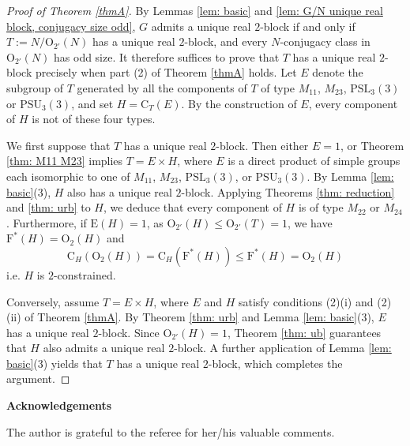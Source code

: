 \documentclass[10pt]{article}
\makeatletter
\newcommand{\ackname}{Acknowledgements}
\newenvironment{acknowledgement}{%
    \titlepage
    \null\vfil
    \@beginparpenalty\@lowpenalty
    \begin{center}%
      \bfseries \ackname
      \@endparpenalty\@M
    \end{center}}%
  {\par\vfil\null\endtitlepage}
\newenvironment{acknowledgement}{%
    \if@twocolumn
      \section*{\ackname}%
    \else
      \small
      \begin{center}%
        {\bfseries \ackname\vspace{-0.5em}\vspace{\z@}}%
      \end{center}%
      \quotation
    \fi}
    {\if@twocolumn\else\endquotation\fi}
\makeatother
\begin{document}
\begin{proof}[Proof of Theorem \ref{thmA}]
  By Lemmas \ref{lem: basic} and \ref{lem: G/N unique real block, conjugacy size odd}, $G$ admits a unique real $2$-block if and only if $T:=N/\mathrm{O}_{2'}(N)$ has a unique real $2$-block,
  and every $N$-conjugacy class in $\mathrm{O}_{2'}(N)$ has odd size.
  It therefore suffices to prove that $T$ has a unique real $2$-block 
  precisely when part (2) of Theorem \ref{thmA} holds.
  Let $E$ denote the subgroup of $T$ generated by all the components of $T$ of type $M_{11}$, $M_{23}$, $\mathrm{PSL}_{3}(3)$ or $\mathrm{PSU}_{3}(3)$, and set $H=\mathrm{C}_{T}(E)$.
  By the construction of $E$, every component of $H$ is not of these four types.
  
  

 
  We first suppose that $T$ has a unique real $2$-block. 
  Then either $E=1$, or Theorem \ref{thm: M11 M23} implies $T=E\times H$, where $E$ is a direct product of simple groups
  each isomorphic to one of $M_{11}$, $M_{23}$, $\mathrm{PSL}_3(3)$, or $\mathrm{PSU}_3(3)$. 
  By Lemma \ref{lem: basic}(3), $H$ also has a unique real $2$-block. 
  Applying Theorems \ref{thm: reduction} and \ref{thm: urb} to $H$, we deduce that every component of $H$ is 
  of type $M_{22}$ or $M_{24}$.
  Furthermore, if $\mathrm{E}(H)=1$, as $\mathrm{O}_{2'}(H)\leq \mathrm{O}_{2'}(T)=1$, we have $\mathrm{F}^*(H)=\mathrm{O}_2(H)$ and
  $$\mathrm{C}_{H}(\mathrm{O}_{2}(H))=\mathrm{C}_{H}(\mathrm{F}^*(H))\leq \mathrm{F}^*(H)=\mathrm{O}_{2}(H)$$
  i.e. $H$ is $2$-constrained.


  Conversely, assume $T=E\times H$, where $E$ and $H$ satisfy conditions (2)(i) and (2)(ii) of Theorem \ref{thmA}. 
  By Theorem \ref{thm: urb} and Lemma \ref{lem: basic}(3), $E$ has a unique real $2$-block. 
  Since $\mathrm{O}_{2'}(H)=1$, Theorem \ref{thm: ub} guarantees that $H$ also admits a unique real $2$-block.
  A further application of Lemma \ref{lem: basic}(3) yields that $T$ has a unique real $2$-block, which completes the argument.
\end{proof}

\bigskip

\begin{acknowledgement}
   The author is grateful to the referee for her/his valuable comments.
\end{acknowledgement}
\end{document}
